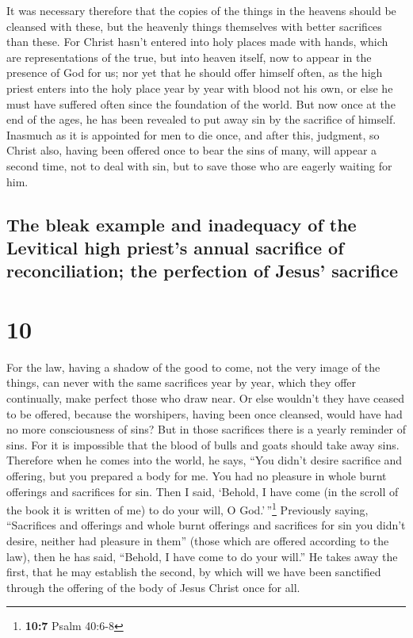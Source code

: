 It was necessary therefore that the copies of the things
in the heavens should be cleansed with these, but the heavenly things
themselves with better sacrifices than these.  For Christ
hasn't entered into holy places made with hands, which are
representations of the true, but into heaven itself, now to appear in
the presence of God for us;  nor yet that he should offer
himself often, as the high priest enters into the holy place year by
year with blood not his own,  or else he must have
suffered often since the foundation of the world. But now once at the
end of the ages, he has been revealed to put away sin by the sacrifice
of himself.  Inasmuch as it is appointed for men to die
once, and after this, judgment,  so Christ also, having
been offered once to bear the sins of many, will appear a second time,
not to deal with sin, but to save those who are eagerly waiting for him.

\hypertarget{the-bleak-example-and-inadequacy-of-the-levitical-high-priests-annual-sacrifice-of-reconciliation-the-perfection-of-jesus-sacrifice}{%
\subsection{The bleak example and inadequacy of the Levitical high
priest's annual sacrifice of reconciliation; the perfection of Jesus'
sacrifice}\label{the-bleak-example-and-inadequacy-of-the-levitical-high-priests-annual-sacrifice-of-reconciliation-the-perfection-of-jesus-sacrifice}}

\hypertarget{section-9}{%
\section{10}\label{section-9}}

 For the law, having a shadow of the good to come, not the
very image of the things, can never with the same sacrifices year by
year, which they offer continually, make perfect those who draw near.
 Or else wouldn't they have ceased to be offered, because
the worshipers, having been once cleansed, would have had no more
consciousness of sins?  But in those sacrifices there is a
yearly reminder of sins.  For it is impossible that the
blood of bulls and goats should take away sins.  Therefore
when he comes into the world, he says, ``You didn't desire sacrifice and
offering, but you prepared a body for me.  You had no
pleasure in whole burnt offerings and sacrifices for sin. 
Then I said, `Behold, I have come (in the scroll of the book it is
written of me) to do your will, O God.'\,''\footnote{\textbf{10:7} Psalm
  40:6-8}  Previously saying, ``Sacrifices and offerings
and whole burnt offerings and sacrifices for sin you didn't desire,
neither had pleasure in them'' (those which are offered according to the
law),  then he has said, ``Behold, I have come to do your
will.'' He takes away the first, that he may establish the second,
 by which will we have been sanctified through the
offering of the body of Jesus Christ once for all.

